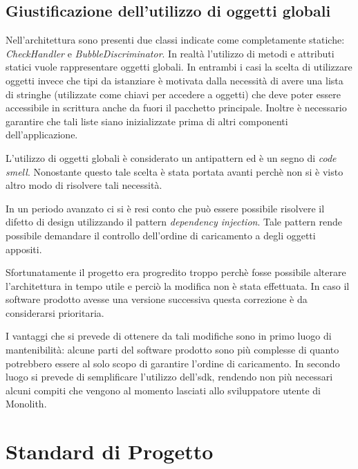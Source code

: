 \subsection{Giustificazione dell'utilizzo di oggetti globali}

Nell'architettura sono presenti due classi indicate come completamente
statiche: \emph{CheckHandler} e \emph{BubbleDiscriminator}.
In realtà l'utilizzo di metodi e attributi statici vuole rappresentare
oggetti globali. In entrambi i casi la scelta di utilizzare oggetti
invece che tipi da istanziare è motivata dalla necessità di avere una
lista di stringhe (utilizzate come chiavi per accedere a oggetti)
 che deve poter essere accessibile in scrittura anche
da fuori il pacchetto principale. Inoltre è necessario garantire che
tali liste siano inizializzate prima di altri componenti
dell'applicazione.


L'utilizzo di oggetti globali è considerato un antipattern ed è un
segno di \emph{code smell}. Nonostante questo tale scelta è stata
portata avanti perchè non si è visto altro modo di risolvere tali
necessità.


In un periodo avanzato ci si è resi conto che può essere possibile
risolvere il difetto di design utilizzando il pattern \emph{dependency
injection}. Tale pattern rende possibile demandare il controllo
dell'ordine di caricamento a degli oggetti appositi.

Sfortunatamente il progetto era progredito troppo perchè fosse
possibile alterare l'architettura in tempo utile e perciò la modifica
non è stata effettuata. In caso il software prodotto avesse una
versione successiva questa correzione è da considerarsi prioritaria.

I vantaggi che si prevede di ottenere da tali modifiche sono in primo
luogo di mantenibilità: alcune parti del software prodotto sono più
complesse di quanto potrebbero essere al solo scopo di garantire
l'ordine di caricamento. In secondo luogo si prevede di semplificare
l'utilizzo dell'sdk, rendendo non più necessari alcuni compiti che
vengono al momento lasciati allo sviluppatore utente di Monolith.







\section{Standard di Progetto}

